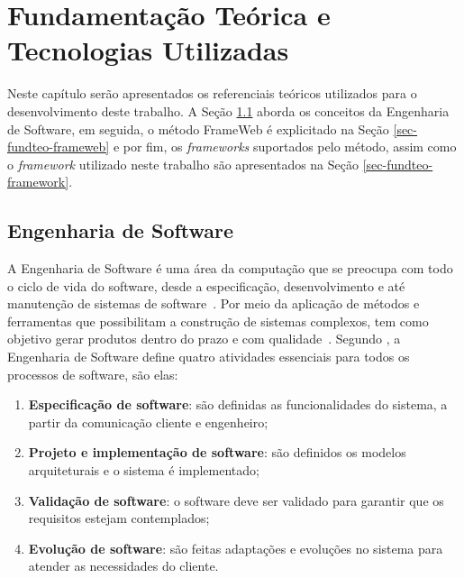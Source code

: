 \chapter{Fundamentação Teórica e Tecnologias Utilizadas}
\label{sec-fundteo}

Neste capítulo serão apresentados os referenciais teóricos utilizados para o desenvolvimento
deste trabalho. A Seção \ref{sec-fundteo-engsoft} aborda os conceitos da Engenharia de Software,
em seguida, o método FrameWeb é explicitado na Seção \ref{sec-fundteo-frameweb}
e por fim, os \textit{frameworks} suportados pelo método, assim como o \textit{framework}
utilizado neste trabalho são apresentados na Seção \ref{sec-fundteo-framework}.

\section{Engenharia de Software}
\label{sec-fundteo-engsoft}

A Engenharia de Software é uma área da computação que se preocupa com todo o ciclo de vida do software,
desde a especificação, desenvolvimento e até manutenção de sistemas de software~\cite{sommerville:2011}.
Por meio da aplicação de métodos e ferramentas que possibilitam a construção de sistemas complexos,
tem como objetivo gerar produtos dentro do prazo e com qualidade~\cite{pressman:2011}.
Segundo , a Engenharia de Software define quatro atividades
essenciais para todos os processos de software, são elas:


\begin{enumerate}
    \item \textbf{Especificação de software}: são definidas as funcionalidades do 
        sistema, a partir da comunicação cliente e engenheiro;
    \item \textbf{Projeto e implementação de software}: são definidos os modelos 
        arquiteturais e o sistema é implementado;
    \item \textbf{Validação de software}: o software deve ser validado para garantir 
        que os requisitos estejam contemplados;
    \item \textbf{Evolução de software}: são feitas adaptações e evoluções no sistema 
        para atender as necessidades do cliente.
\end{enumerate}


